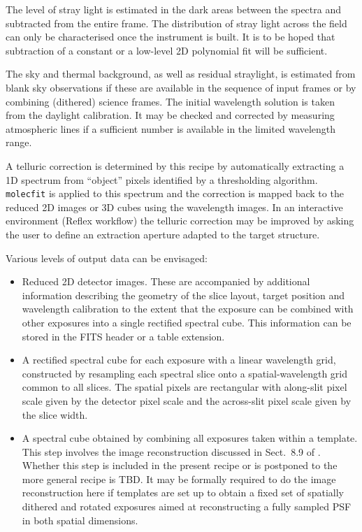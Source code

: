 The level of stray light is estimated in the dark areas between the
spectra and subtracted from the entire frame. The distribution of
stray light across the field can only be characterised once the
instrument is built. It is to be hoped that subtraction of a constant
or a low-level 2D polynomial fit will be sufficient.

The sky and thermal background, as well as residual straylight, is
estimated from blank sky observations if these are available in the
sequence of input frames or by combining (dithered) science
frames. The initial wavelength solution is taken from the daylight
calibration. It may be checked and corrected by measuring atmospheric
lines if a sufficient number is available in the limited wavelength
range.

A telluric correction is determined by this recipe by automatically
extracting a 1D spectrum from ``object'' pixels identified by a
thresholding algorithm. \lstinline{molecfit} is applied to this
spectrum and the correction is mapped back to the reduced 2D images or
3D cubes using the wavelength images. In an interactive environment
(Reflex workflow) the telluric correction may be improved by asking
the user to define an extraction aperture adapted to the target
structure.

Various levels of output data can be envisaged:
\begin{itemize}
\item Reduced 2D detector images. These are accompanied by additional
  information describing the geometry of the slice layout, target
  position and wavelength calibration to the extent that the exposure can be
  combined with other exposures into a single rectified spectral cube.
  This information can be stored in the FITS header or a table
  extension.
\item A rectified spectral cube for each exposure with a linear
  wavelength grid, constructed by resampling each spectral slice onto
  a spatial-wavelength grid common to all slices. The spatial pixels
  are rectangular with along-slit pixel scale given by the detector
  pixel scale and the across-slit pixel scale given by the slice
  width.
\item A spectral cube obtained by combining all exposures taken within
  a template. This step involves the image reconstruction discussed in
  Sect.~8.9 of \cite{DRLS}. Whether this step is included
  in the present recipe \hyperref[rec:metis_ifu_sci_process]{} or is postponed to
  the more general recipe \hyperref[rec:metis_ifu_sci_postprocess]{} is TBD. It
  may be formally required to do the image reconstruction here if
  templates are set up to obtain a fixed set of spatially dithered and
  rotated exposures aimed at reconstructing a fully sampled PSF in
  both spatial dimensions.
\end{itemize}

